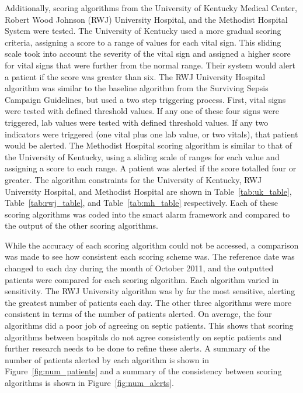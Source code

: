 \documentclass{sig-alternate}
\begin{document}
Additionally, scoring algorithms from the University of Kentucky Medical Center, Robert Wood Johnson (RWJ) University Hospital, and the Methodist Hospital System were tested.  The University of Kentucky used a more gradual scoring criteria, assigning a score to a range of values for each vital sign.  This sliding scale took into account the severity of the vital sign and assigned a higher score for vital signs that were further from the normal range.  Their system would alert a patient if the score was greater than six.  The RWJ University Hospital algorithm was similar to the baseline algorithm from the Surviving Sepsis Campaign Guidelines, but used a two step triggering process.  First, vital signs were tested with defined threshold values.  If any one of these four signs were triggered, lab values were tested with defined threshold values.  If any two indicators were triggered (one vital plus one lab value, or two vitals), that patient would be alerted.  The Methodist Hospital scoring algorithm is similar to that of the University of Kentucky, using a sliding scale of ranges for each value and assigning a score to each range.  A patient was alerted if the score totalled four or greater.  The algorithm constraints for the University of Kentucky, RWJ University Hospital, and Methodist Hospital are shown in Table~\ref{tab:uk_table}, Table~\ref{tab:rwj_table}, and Table~\ref{tab:mh_table} respectively.  Each of these scoring algorithms was coded into the smart alarm framework and compared to the output of the other scoring algorithms.


While the accuracy of each scoring algorithm could not be accessed, a comparison was made to see how consistent each scoring scheme was.  The reference date was changed to each day during the month of October 2011, and the outputted patients were compared for each scoring algorithm.  Each algorithm varied in sensitivity.  The RWJ University algorithm was by far the most sensitive, alerting the greatest number of patients each day.  The other three algorithms were more consistent in terms of the number of patients alerted.  On average, the four algorithms did a poor job of agreeing on septic patients.  This shows that scoring algorithms between hospitals do not agree consistently on septic patients and further research needs to be done to refine these alerts.  A summary of the number of patients alerted by each algorithm is shown in Figure~\ref{fig:num_patients} and a summary of the consistency between scoring algorithms is shown in Figure~\ref{fig:num_alerts}.
\end{document}
